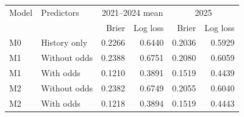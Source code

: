 \begin{tabular}{llrrrr}
\toprule
Model & Predictors & \multicolumn{2}{c}{2021--2024 mean} & \multicolumn{2}{c}{2025} \\ 
 & & Brier & Log loss & Brier & Log loss \\
\midrule
M0 & History only & 0.2266 & 0.6440 & 0.2036 & 0.5929 \\
M1 & Without odds & 0.2388 & 0.6751 & 0.2080 & 0.6059 \\
M1 & With odds & 0.1210 & 0.3891 & 0.1519 & 0.4439 \\
M2 & Without odds & 0.2382 & 0.6749 & 0.2055 & 0.6040 \\
M2 & With odds & 0.1218 & 0.3894 & 0.1519 & 0.4443 \\
\bottomrule
\end{tabular}
